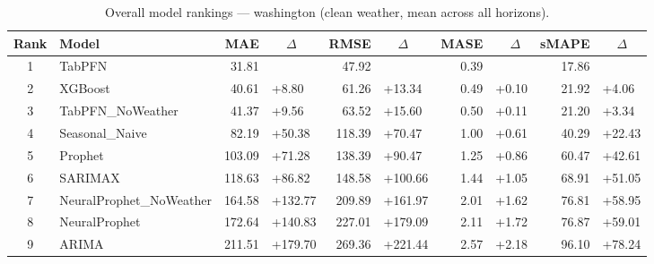 \begin{table}[ht!]
\centering
\caption{Overall model rankings — washington (clean weather, mean across all horizons).}
\label{tab:overall_rankings_washington}
{\small
\setlength{\tabcolsep}{3pt}
\scriptsize
\begin{tabular}{clrlrlrlrl}
\toprule
Rank & Model & MAE & ~~\(\Delta\) & RMSE & ~~\(\Delta\) & MASE & ~~\(\Delta\) & sMAPE & ~~\(\Delta\) \\
\midrule
1 & TabPFN & 31.81 &  & 47.92 &  & 0.39 &  & 17.86 &  \\
2 & XGBoost & 40.61 & +8.80 & 61.26 & +13.34 & 0.49 & +0.10 & 21.92 & +4.06 \\
3 & TabPFN_NoWeather & 41.37 & +9.56 & 63.52 & +15.60 & 0.50 & +0.11 & 21.20 & +3.34 \\
4 & Seasonal_Naive & 82.19 & +50.38 & 118.39 & +70.47 & 1.00 & +0.61 & 40.29 & +22.43 \\
5 & Prophet & 103.09 & +71.28 & 138.39 & +90.47 & 1.25 & +0.86 & 60.47 & +42.61 \\
6 & SARIMAX & 118.63 & +86.82 & 148.58 & +100.66 & 1.44 & +1.05 & 68.91 & +51.05 \\
7 & NeuralProphet_NoWeather & 164.58 & +132.77 & 209.89 & +161.97 & 2.01 & +1.62 & 76.81 & +58.95 \\
8 & NeuralProphet & 172.64 & +140.83 & 227.01 & +179.09 & 2.11 & +1.72 & 76.87 & +59.01 \\
9 & ARIMA & 211.51 & +179.70 & 269.36 & +221.44 & 2.57 & +2.18 & 96.10 & +78.24 \\
\bottomrule
\end{tabular}
}
\end{table}
